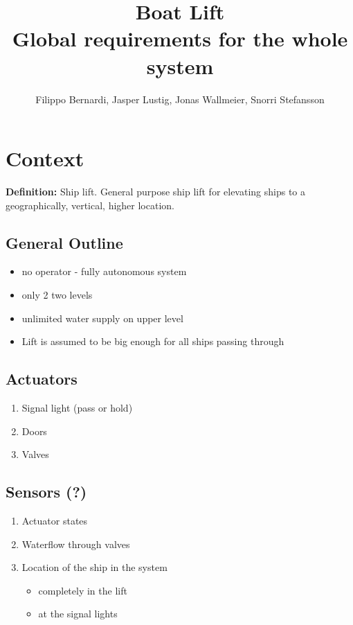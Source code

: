 \documentclass{article}
\begin{document}
\title{\huge{Boat Lift} \\ {\fontsize{13}{1} \selectfont Global requirements for the whole system} }
\author{Filippo Bernardi, Jasper Lustig, Jonas Wallmeier, Snorri Stefansson}

\maketitle



\vspace{3cm}

\section{Context}
\textbf{Definition:}
Ship lift. General purpose ship lift for elevating ships to a geographically, vertical, higher location. \\
\subsection{General Outline}
\begin{itemize}
	\item no operator - fully autonomous system
	\item only 2 two levels
	\item unlimited water supply on upper level
	\item Lift is assumed to be big enough for all ships passing through
\end{itemize}
\subsection{Actuators}
\begin{enumerate}
	\item Signal light (pass or hold)
	\item Doors
	\item Valves
\end{enumerate}

\subsection{Sensors (?)}
\begin{enumerate}
	\item Actuator states
	\item Waterflow through valves
	\item Location of the ship in the system
	\begin{itemize}
		\item completely in the lift
		\item at the signal lights
	\end{itemize}
\end{enumerate}
\end{document}
